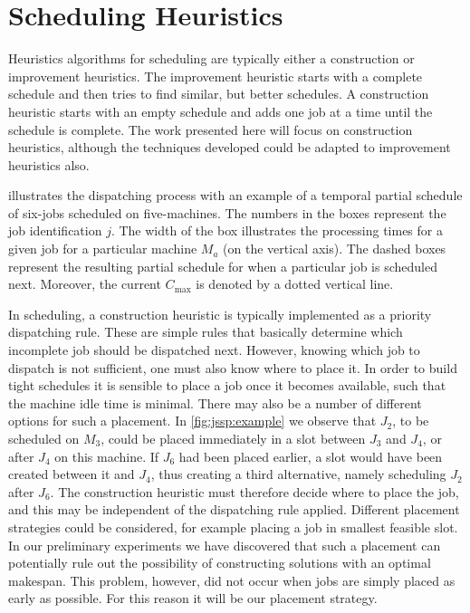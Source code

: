 \documentclass[smallextended]{svjour3}
\begin{document}
\section{Scheduling Heuristics} \label{sec:constructionjssp}
Heuristics algorithms for scheduling are typically either a construction or 
improvement heuristics. The improvement heuristic starts with a complete 
schedule and then tries to find similar, but better schedules.  A construction 
heuristic starts with an empty schedule and adds one job at a time until the 
schedule is complete. The work presented here will focus on construction 
heuristics, although the techniques developed could be adapted to improvement
heuristics also. 

 illustrates the dispatching process with an example of 
a temporal partial schedule of six-jobs scheduled on five-machines. The numbers 
in the boxes represent the job identification $j$. The width of the box 
illustrates the processing times for a given job for a particular machine $M_a$ 
(on the vertical axis). The dashed boxes represent the resulting partial 
schedule for when a particular job is scheduled next. Moreover, the current 
$C_{\max}$ is denoted by a dotted vertical line. 

In scheduling, a construction heuristic is typically implemented as a priority 
dispatching rule. These are simple rules that basically determine which 
incomplete job should be dispatched next. 
However, knowing which job to dispatch is not sufficient, one must also know 
where to place it. In order to build tight schedules it is sensible to place a 
job once it becomes available, such that the machine idle time is minimal. 
There may also be a number of different options for such a placement. 
In \cref{fig:jssp:example} we observe that $J_2$, to be scheduled on $M_3$, 
could be placed immediately in a slot between $J_3$ and $J_4$, or after $J_4$ 
on this machine. 
If $J_6$ had been placed earlier, a slot would have been created between it and 
$J_4$, thus creating a third alternative, namely scheduling $J_2$ after $J_6$. 
The construction heuristic must therefore decide where to place the job, and 
this may be independent of the dispatching rule applied. 
Different placement strategies could be considered, for example placing a job 
in smallest feasible slot. In our preliminary experiments we have discovered 
that such a placement can potentially rule out the possibility of constructing 
solutions with an optimal makespan.
This problem, however, did not occur when jobs are simply placed as early as 
possible. For this reason it will be our placement strategy.
\end{document}
